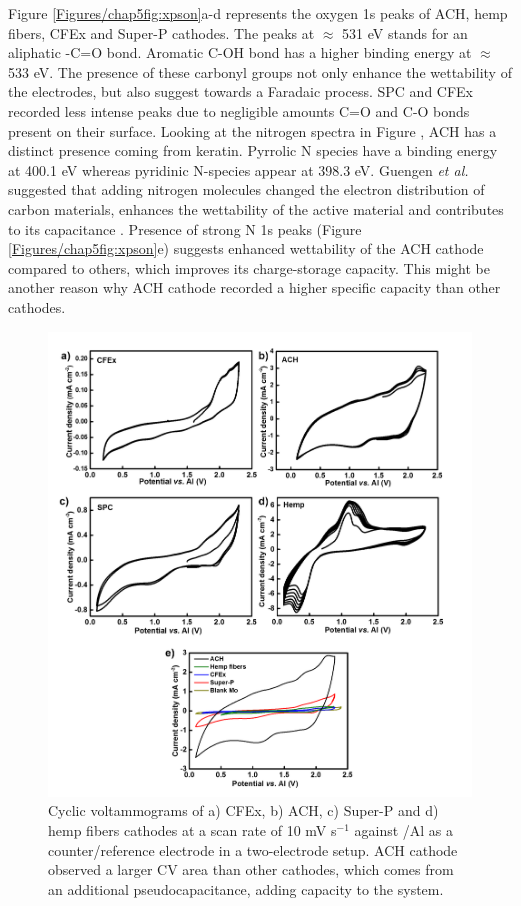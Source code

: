 Figure \ref{Figures/chap5fig:xpson}a-d represents the oxygen 1s peaks of ACH, hemp fibers, CFEx and Super-P cathodes. The peaks at $\approx$ 531 eV stands for an aliphatic -C=O bond. Aromatic C-OH bond has a higher binding energy at $\approx$ 533 eV. The presence of these carbonyl groups not only enhance the wettability of the electrodes, but also suggest towards a Faradaic process\cite{}. 
SPC and CFEx recorded less intense peaks due to negligible amounts C=O and C-O bonds present on their surface. Looking at the nitrogen spectra in Figure , ACH has a distinct presence coming from keratin. Pyrrolic N species have a binding energy at 400.1 eV whereas pyridinic N-species appear at 398.3 eV. Guengen \textit{et al.} suggested that adding nitrogen molecules changed the electron distribution of carbon materials, enhances the wettability of the active material and  contributes to its capacitance \cite{gueguen_xps_2016}. Presence of strong N 1s peaks (Figure \ref{Figures/chap5fig:xpson}e) suggests enhanced wettability of the ACH cathode compared to others, which improves its charge-storage capacity. This might be another reason why ACH cathode recorded a higher specific capacity than other cathodes. 

 \begin{figure}[tbh!]
  \centering
  \includegraphics[width=\textwidth]{Figures/chap5fig/CV}
    \caption{Cyclic voltammograms of a) CFEx, b) ACH, c) Super-P and d) hemp fibers cathodes at a scan rate of 10 mV s$^{-1}$ against /Al as a counter/reference electrode in a two-electrode setup. ACH cathode observed a larger CV area than other cathodes, which comes from an additional pseudocapacitance, adding capacity to the system.}
  \label{Figures/chap5fig:CV}
\end{figure}

